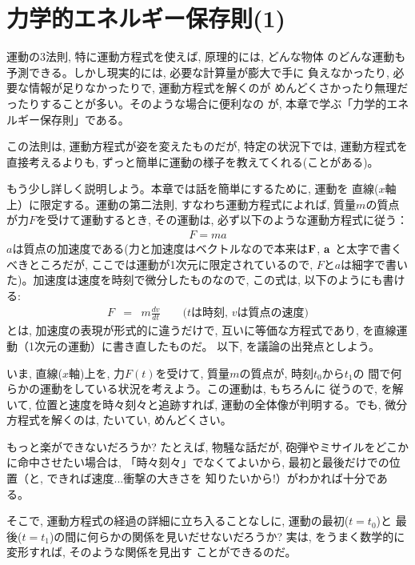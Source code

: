 \chapter{力学的エネルギー保存則(1)}\label{chapt:consenergy1}

運動の3法則, 特に運動方程式を使えば, 原理的には, どんな物体
のどんな運動も予測できる。しかし現実的には, 必要な計算量が膨大で手に
負えなかったり, 必要な情報が足りなかったりで, 運動方程式を解くのが
めんどくさかったり無理だったりすることが多い。そのような場合に便利なの
が, 本章で学ぶ「力学的エネルギー保存則」である。

この法則は, 運動方程式が姿を変えたものだが, 特定の状況下では, 
運動方程式を直接考えるよりも, ずっと簡単に運動の様子を教えてくれる(ことがある)。

もう少し詳しく説明しよう。本章では話を簡単にするために, 運動を
直線($x$軸上）に限定する。運動の第二法則, すなわち運動方程式によれば, 
質量$m$の質点が力$F$を受けて運動するとき, その運動は, 必ず以下のような運動方程式に従う：
\begin{eqnarray}F=ma\label{eq:F_ma_energy0}\end{eqnarray}
$a$は質点の加速度である(力と加速度はベクトルなので本来は${\bf F}$, ${\bf a}$
と太字で書くべきところだが, ここでは運動が1次元に限定されているので, 
$F$と$a$は細字で書いた)。加速度は速度を時刻で微分したものなので, この式は, 
以下のようにも書ける:
\begin{eqnarray}
F&=&m\frac{dv}{dt}\quad\quad\text{($t$は時刻, $v$は質点の速度)}\label{eq:F_ma_energy1}
\end{eqnarray}
とは, 加速度の表現が形式的に違うだけで, 
互いに等価な方程式であり, を直線運動（1次元の運動）に書き直したものだ。
以下, を議論の出発点としよう。\mv

いま, 直線($x$軸)上を, 力$F(t)$を受けて, 質量$m$の質点が, 時刻$t_0$から$t_1$の
間で何らかの運動をしている状況を考えよう。この運動は, もちろんに
従うので, を解いて, 位置と速度を時々刻々と追跡すれば, 
運動の全体像が判明する。でも, 微分方程式を解くのは, たいてい, めんどくさい。

もっと楽ができないだろうか? たとえば, 物騒な話だが, 
砲弾やミサイルをどこかに命中させたい場合は, 「時々刻々」でなくてよいから, 
最初と最後だけでの位置（と, できれば速度...衝撃の大きさを
知りたいから!）がわかれば十分である。

そこで, 運動方程式の経過の詳細に立ち入ることなしに, 運動の最初($t=t_0$)と
最後($t=t_1$)の間に何らかの関係を見いだせないだろうか? 実は, 
をうまく数学的に変形すれば, そのような関係を見出す
ことができるのだ。


